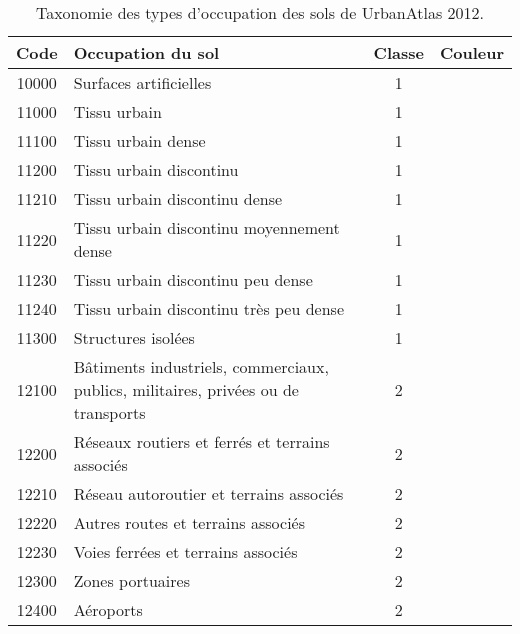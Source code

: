 \begin{table}[ht]
	\caption{Taxonomie des types d'occupation des sols de UrbanAtlas 2012.}
	\label{tab:ua2012_classes}
	\begin{tabularx}{\textwidth}{c Y c c}
		\toprule
		\textbf{Code} & \textbf{Occupation du sol} & \textbf{Classe} & \textbf{Couleur}\\
		\midrule
		10000 & Surfaces artificielles & 1 & \\
		11000 & Tissu urbain & 1 & \\
		11100 & Tissu urbain dense & 1 & \\
		11200 & Tissu urbain discontinu & 1 & \\
		11210 & Tissu urbain discontinu dense & 1 & \\
		11220 & Tissu urbain discontinu moyennement dense & 1 & \\
		11230 & Tissu urbain discontinu peu dense & 1 & \\
		11240 & Tissu urbain discontinu très peu dense & 1 & \\
		11300 & Structures isolées & 1 & \\
		12100 & Bâtiments industriels, commerciaux, publics, militaires, privées ou de transports & 2 & \\
 		12200 & Réseaux routiers et ferrés et terrains associés & 2 & \\
		12210 & Réseau autoroutier et terrains associés & 2 & \\
		12220 & Autres routes et terrains associés & 2 & \\
		12230 & Voies ferrées et terrains associés & 2 & \\
		12300 & Zones portuaires & 2 & \\
		12400 & Aéroports & 2 & \\

\end{tabularx}
\end{table}
